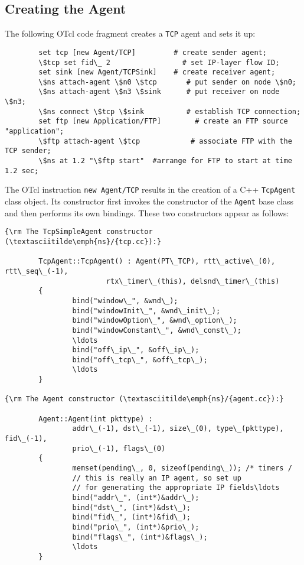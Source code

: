 \subsection{Creating the Agent}
\label{sec:createtcpsimple}

The following OTcl code fragment creates a {\tt TCP} agent
and sets it up:
\begin{verbatim}
        set tcp [new Agent/TCP]         # create sender agent;
        \$tcp set fid\_ 2                 # set IP-layer flow ID;
        set sink [new Agent/TCPSink]    # create receiver agent;
        \$ns attach-agent \$n0 \$tcp       # put sender on node \$n0;
        \$ns attach-agent \$n3 \$sink      # put receiver on node \$n3;
        \$ns connect \$tcp \$sink          # establish TCP connection;
        set ftp [new Application/FTP]        # create an FTP source "application";
        \$ftp attach-agent \$tcp            # associate FTP with the TCP sender;
        \$ns at 1.2 "\$ftp start"  #arrange for FTP to start at time 1.2 sec;
\end{verbatim}
The OTcl instruction {\tt new Agent/TCP} results in the
creation of a C++ {\tt TcpAgent} class object.
Its constructor first invokes the constructor of the
{\tt Agent} base class and then performs its own bindings.
These two constructors appear as follows:
\begin{verbatim}
{\rm The TcpSimpleAgent constructor (\textasciitilde\emph{ns}/{tcp.cc}):}

        TcpAgent::TcpAgent() : Agent(PT\_TCP), rtt\_active\_(0), rtt\_seq\_(-1),
                        rtx\_timer\_(this), delsnd\_timer\_(this)
        {
                bind("window\_", &wnd\_);
                bind("windowInit\_", &wnd\_init\_);
                bind("windowOption\_", &wnd\_option\_);
                bind("windowConstant\_", &wnd\_const\_);
                \ldots
                bind("off\_ip\_", &off\_ip\_);
                bind("off\_tcp\_", &off\_tcp\_);
                \ldots
        }

{\rm The Agent constructor (\textasciitilde\emph{ns}/{agent.cc}):}

        Agent::Agent(int pkttype) : 
                addr\_(-1), dst\_(-1), size\_(0), type\_(pkttype), fid\_(-1),
                prio\_(-1), flags\_(0)
        {
                memset(pending\_, 0, sizeof(pending\_)); /* timers /
                // this is really an IP agent, so set up
                // for generating the appropriate IP fields\ldots
                bind("addr\_", (int*)&addr\_);
                bind("dst\_", (int*)&dst\_);
                bind("fid\_", (int*)&fid\_);
                bind("prio\_", (int*)&prio\_);
                bind("flags\_", (int*)&flags\_);
                \ldots
        }
\end{verbatim}
